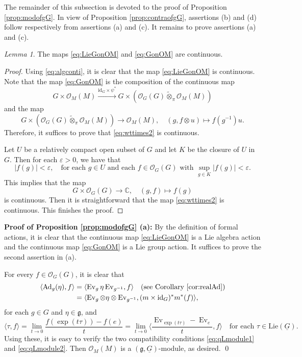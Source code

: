 \documentclass[12pt, a4paper]{amsart}
\newcommand{\BC}{{\mathbb {C}}}
\newcommand{\CO}{{\mathcal {O}}}
\newcommand{\Ad}{{\mathrm{Ad}}}
\newcommand{\Lie}{{\mathrm{Lie}}}
\newcommand{\wt}{\widetilde}
\newcommand{\Ev}{\operatorname{Ev}}
\newcommand{\g}{\mathfrak g}
\newcommand{\la}{\langle}
\newcommand{\ra}{\rangle}
\newcommand{\be}{\begin {equation}}
\newcommand{\ee}{\end {equation}}
\theoremstyle{Theorem}
\theoremstyle{Theorem}
\theoremstyle{Theorem}
\theoremstyle{Theorem}
\theoremstyle{Plain}
\theoremstyle{remark}
\theoremstyle{remark}
\theoremstyle{Definition}
\newtheorem{lemd}[dfn]{Lemma}
\numberwithin{equation}{section}
\begin{document}
The remainder of this subsection is devoted to the proof of Proposition \ref{prop:modofgG}. 
In view of Proposition \ref{prop:contraofgG}, assertions (b) and (d) follow respectively from assertions (a) and (c). 
It remains to prove assertions (a) and (c).


\begin{lemd}\label{lem:GcontinuonOM}
    The maps \eqref{eq:LieGonOM} and \eqref{eq:GonOM} are continuous. 
\end{lemd}
\begin{proof}
 Using \eqref{eq:algconti}, it is clear that the map \eqref{eq:LieGonOM} is continuous.   Note that  the map \eqref{eq:GonOM} is the composition of the continuous map
    \[G\times \CO_M(M)\xrightarrow{\mathrm{id}_{G} \times \psi^*} G\times  (\CO_G(G)\wt\otimes_{\pi} \CO_M(M))\]
    and the map 
    \be \label{eq:wttimes2}G\times (\CO_G(G)\wt\otimes_{\pi}\CO_M(M) )\rightarrow \CO_M(M),\quad (g, f\otimes u)\mapsto f(g^{-1})u.\ee 
     Therefore, it suffices to prove that \eqref{eq:wttimes2} is continuous.
    
 Let $U$ be a relatively compact open subset of $G$ and let $K$ be the closure of $U$ in $G$. Then for each $\varepsilon>0$, we have that   
     \[|f(g)|<\varepsilon,\quad  \text{for each $g\in U$ and each $f\in \CO_G(G)$ with $\sup_{g\in K}|f(g)|<\varepsilon$}.\] %
This implies that the map \be\label{eq:GO(G)} G\times \CO_G(G)\rightarrow \BC,\quad  (g,f)\mapsto f(g)\ee  is continuous. Then it is straightforward that the map \eqref{eq:wttimes2} is continuous. This finishes the proof.
\end{proof}
 



\noindent\textbf{Proof of Proposition \ref{prop:modofgG} (a):} 
By the definition of formal actions, it is clear that the continuous map \eqref{eq:LieGonOM} is a Lie algebra action and the continuous map \eqref{eq:GonOM} is a Lie group action. It suffices to prove the second assertion in (a).

 For every  $f\in \CO_G(G)$,  it is clear that
\[
\begin{aligned}
\la \Ad_g(\eta),f\ra
&=\la \Ev_g\eta\Ev_{g^{-1}},f\ra \quad \text{(see Corollary \ref{cor:realAd})}\\
&=\la \Ev_g\otimes\eta\otimes\Ev_{g^{-1}},
(m\times\mathrm{id}_G)^*m^*(f)\ra,
\end{aligned}\]
for each $g\in G$ and $\eta\in\g$,
and 
\[\la\tau,f \ra=\lim_{t\rightarrow 0} \frac{f(\exp{(t\tau)})-f(e)}{t}=\lim_{t\rightarrow 0}\la \frac{\Ev_{\exp(t\tau)}-\Ev_e}{t},f\ra \quad\text{for each $\tau\in \Lie(\underline{G})$}.\]%
Using these, it is easy to verify the two compatibility conditions
\eqref{eq:qLmodule1} and \eqref{eq:qLmodule2}. Then 
$\CO_M(M)$ is a $(\g,\underline{G})$-module, as desired.
\qed
\vspace{3mm}
\end{document}
